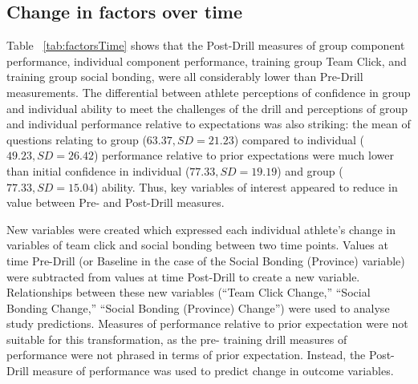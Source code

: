 \begin{CJK}{UTF8}{gbsn}



\subsection{Change in factors over time}
Table ~\ref{tab:factorsTime} shows that the Post-Drill measures of group component performance, individual component performance, training group Team Click, and training group social bonding, were all considerably lower than Pre-Drill measurements. The differential between athlete perceptions of confidence in group and individual ability to meet the challenges of the drill and perceptions of group and individual performance relative to expectations was also striking: the mean of questions relating to group ($63.37, SD = 21.23$) compared to individual ($49.23, SD = 26.42$) performance relative to prior expectations were much lower than initial confidence in individual ($77.33, SD = 19.19$) and group ($77.33, SD = 15.04$) ability.  Thus, key variables of interest appeared to reduce in value between Pre- and Post-Drill measures.



New variables were created which expressed each individual athlete's change in variables of team click and social bonding between two time points.  Values at time Pre-Drill (or Baseline in the case of the Social Bonding (Province) variable) were subtracted from values at time Post-Drill to create a new variable.  Relationships between these new variables (``Team Click Change,'' ``Social Bonding Change,'' ``Social Bonding (Province) Change'') were used to analyse study predictions. Measures of performance relative to prior expectation were not suitable for this transformation, as the pre- training drill measures of performance were not phrased in terms of prior expectation.  Instead, the Post-Drill measure of performance was used to predict change in outcome variables.


\end{CJK}
